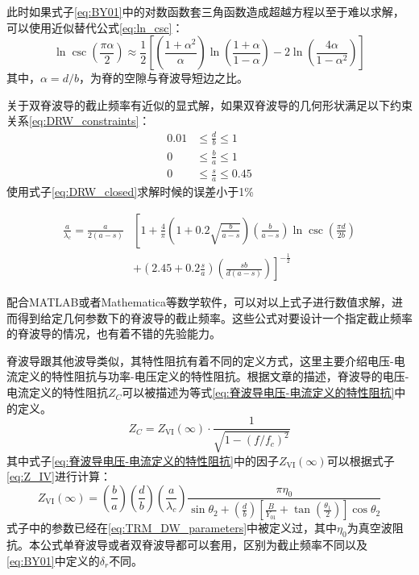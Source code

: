 \documentclass[master]{thesis-uestc}
\begin{document}
此时如果式子\ref{eq:BY01}中的对数函数套三角函数造成超越方程以至于难以求解，可以使用近似替代公式\ref{eq:ln_csc}：
\begin{equation}
    \ln \csc \left( \frac{\pi \alpha}{2} \right) \approx \frac{1}{2} \left[ \left( \frac{1 + \alpha^2}{\alpha} \right) \ln \left( \frac{1 + \alpha}{1 - \alpha} \right) - 2 \ln \left( \frac{4 \alpha}{1 - \alpha^2} \right) \right] \label{eq:ln_csc}
\end{equation}
其中，$\alpha=d/b$，为脊的空隙与脊波导短边之比。

关于双脊波导的截止频率有近似的显式解，如果双脊波导的几何形状满足以下约束关系\ref{eq:DRW_constraints}：
\begin{equation}\label{eq:DRW_constraints}
    \begin{aligned}
    0.01 &\leq \frac{d}{b} \leq 1 \\
    0 &\leq \frac{b}{a} \leq 1 \\
    0 &\leq \frac{s}{a} \leq 0.45
    \end{aligned}
\end{equation}
使用式子\ref{eq:DRW_closed}求解时候的误差小于1\%

\begin{equation}\label{eq:DRW_closed}
    \begin{split}
        \frac{a}{\lambda_c} = \frac{a}{2(a - s)} & \left[ 1 + \frac{4}{\pi} \left( 1 + 0.2 \sqrt{\frac{b}{a - s}} \right) \left( \frac{b}{a - s} \right) \ln \csc \left( \frac{\pi d}{2b} \right) \right. \\
        & \left. + \left( 2.45 + 0.2 \frac{s}{a} \right) \left( \frac{sb}{d(a - s)} \right) \right]^{-\frac{1}{2}}
    \end{split}
\end{equation}

配合MATLAB或者Mathematica等数学软件，可以对以上式子进行数值求解，进而得到给定几何参数下的脊波导的截止频率。这些公式对要设计一个指定截止频率的脊波导的情况，也有着不错的先验能力。

脊波导跟其他波导类似，其特性阻抗有着不同的定义方式，这里主要介绍电压-电流定义的特性阻抗与功率-电压定义的特性阻抗。根据文章\cite{Hoefer1982AnalyticalEF}的描述，脊波导的电压-电流定义的特性阻抗\(Z_C\)可以被描述为等式\ref{eq:脊波导电压-电流定义的特性阻抗}中的定义。
\begin{equation}\label{eq:脊波导电压-电流定义的特性阻抗}
    Z_C = Z_{\mathrm{VI}}(\infty) \cdot \frac{1}{\sqrt{1-(f/f_c)^2}}
\end{equation}
其中式子\ref{eq:脊波导电压-电流定义的特性阻抗}中的因子\(Z_{\mathrm{VI}}(\infty)\)可以根据式子\ref{eq:Z_IV}进行计算：
\begin{equation}\label{eq:Z_IV}
    Z_{\mathrm{VI}}(\infty) = \left( \frac{b}{a} \right) \left( \frac{d}{b} \right) \left( \frac{a}{\lambda_c} \right) \frac{\pi \eta_0}{\sin \theta_2 + \left( \frac{d}{b} \right) \left[ \frac{B}{Y_{01}} + \tan \left( \frac{\theta_1}{2} \right) \right] \cos \theta_2}
\end{equation}
式子中的参数已经在\ref{eq:TRM_DW_parameters}中被定义过，其中$\eta_0$为真空波阻抗。本公式单脊波导或者双脊波导都可以套用，区别为截止频率不同以及\ref{eq:BY01}中定义的$\delta_{r}$不同。
\end{document}
